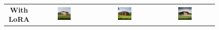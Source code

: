 \begin{figure}[H]
  \centering
  {\footnotesize
  \renewcommand{\arraystretch}{1.1}
  \setlength{\tabcolsep}{4pt}
  \begin{tabular}{c c c c}
    \textbf{With LoRA} &
    \includegraphics[width=0.25\textwidth]{Images/Results/Architect-B_unstructured-phase/generated_images/4/Met_lora_00023_.png} &
    \includegraphics[width=0.25\textwidth]{Images/Results/Architect-B_unstructured-phase/generated_images/4/Met_lora_00024_.png} &
    \includegraphics[width=0.25\textwidth]{Images/Results/Architect-B_unstructured-phase/generated_images/4/Met_lora_00027_.png} \\


\end{tabular}}
\end{figure}
